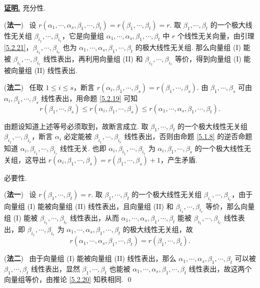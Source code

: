 \documentclass[10pt,openany]{article}
\theoremstyle{thmstyle} %
\theoremstyle{defstyle} %
\theoremstyle{prostyle} %
\theoremstyle{exastyle}
\theoremstyle{remstyle}
\renewenvironment{proof}[1][证明]{\par\underline{\textbf{#1.}} \;\fangsong}{\qed\par}
\begin{document}
\begin{proof}
	充分性. 
	
	(\textbf{法一}) \ 设 \( r(\alpha_1,\cdots,\alpha_s,\beta_1,\cdots,\beta_t)=r(\beta_1,\cdots,\beta_t)=r \). 取 \( \beta_1,\cdots,\beta_t \) 的一个极大线性无关组 \( \beta_{i_1},\cdots,\beta_{i_r} \)，它是向量组 \( \alpha_1,\cdots,\alpha_s,\beta_1,\cdots,\beta_t \) 中 \( r \) 个线性无关向量，由引理 \ref{5.2.21}，\( \beta_{i_1},\cdots,\beta_{i_r} \) 也为 \( \alpha_1,\cdots,\alpha_s,\beta_1,\cdots,\beta_t \) 的极大线性无关组. 那么向量组 (I) 能被 \( \beta_{i_1},\cdots,\beta_{i_r} \) 线性表出，再利用向量组 (II) 和 \( \beta_{i_1},\cdots,\beta_{i_r} \) 等价，得到向量组 (I) 能被向量组 (II) 线性表出.
	
	(\textbf{法二}) \ 任取 \( 1 \leq i \leq s \)，断言 \( r(\alpha_i,\beta_1,\cdots,\beta_s)=r(\beta_1,\cdots,\beta_s) \). 由 \( \beta_1,\cdots,\beta_s \) 可由 \( \alpha_i,\beta_1,\cdots,\beta_s \) 线性表出，用命题 \ref{5.2.19} 可知
	\[ r(\beta_1,\cdots,\beta_s) \leq r(\alpha_i,\beta_1,\cdots,\beta_s) \leq r(\alpha_1,\cdots,\alpha_s,\beta_1,\cdots,\beta_t). \]
	
	由题设知道上述等号必须取到，故断言成立. 取 \( \beta_1,\cdots,\beta_t \) 的一个极大线性无关组 \( \beta_{i_1},\cdots,\beta_{i_r} \)，断言 \( \alpha_i \) 必定能被 \( \beta_{i_1},\cdots,\beta_{i_r} \) 线性表出，否则由命题 \ref{5.1.8} 的逆否命题知道 \( \alpha_i, \beta_{i_1},\cdots,\beta_{i_r} \) 线性无关. 也即 \( \alpha_i,\beta_{i_1},\cdots,\beta_{i_r}\) 为 \( \alpha_i,\beta_1,\cdots,\beta_s \) 的一个极大线性无关组，这导出 \( r(\alpha_i,\beta_1,\cdots,\beta_s)=r(\beta_1,\cdots,\beta_s)+1 \)，产生矛盾.
	
	\vspace{1ex}
	
	必要性. 
	
	(\textbf{法一}) \ 设 \( r(\beta_1,\cdots,\beta_t)=r  \). 取 \( \beta_1,\cdots,\beta_t \) 的一个极大线性无关组 \( \beta_{i_1},\cdots,\beta_{i_r} \)，由于向量组 (I) 能被向量组 (II) 线性表出，且向量组 (II) 和 \( \beta_{i_1},\cdots,\beta_{i_r} \) 等价，那么向量组 (I) 能被 \( \beta_{i_1},\cdots,\beta_{i_r} \) 线性表出，从而 \( \alpha_1,\cdots,\alpha_s,\beta_1,\cdots,\beta_t \) 能被 \( \beta_{i_1},\cdots,\beta_{i_r} \) 线性表出，即 \( \beta_{i_1},\cdots,\beta_{i_r} \) 为 \( \alpha_1,\cdots,\alpha_s,\beta_1,\cdots,\beta_t \) 的极大线性无关组，故
	\[ r(\alpha_1,\cdots,\alpha_s,\beta_1,\cdots,\beta_t)=r(\beta_1,\cdots,\beta_t).\]
	
	(\textbf{法二}) \ 由于向量组 (I) 能被向量组 (II) 线性表出，那么 \( \alpha_1,\cdots,\alpha_s,\beta_1,\cdots,\beta_t \) 可以被 \( \beta_1,\cdots,\beta_t \) 线性表出，显然 \( \beta_1,\cdots,\beta_t \) 也能被 \( \alpha_1,\cdots,\alpha_s,\beta_1,\cdots,\beta_t \) 线性表出，故这两个向量组等价，由推论 \ref{5.2.20} 知秩相同.
\end{proof}
\end{document}
